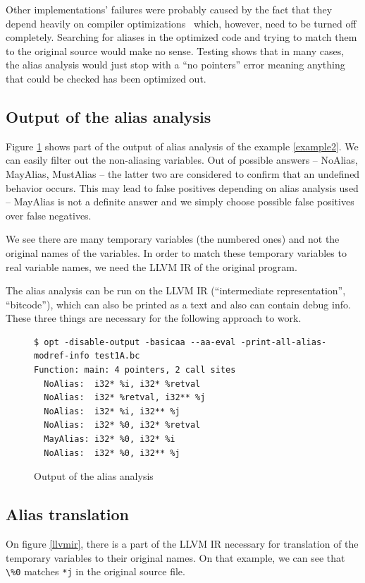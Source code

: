 Other implementations' failures were probably caused by the fact that they depend heavily on compiler optimizations~\cite{alias-analysis-optimizations} which, however, need to be turned off completely. Searching for aliases in the optimized code and trying to match them to the original source would make no sense. Testing shows that in many cases, the alias analysis would just stop with a ``no pointers'' error meaning anything that could be checked has been optimized out.

\subsection{Output of the alias analysis}
Figure \ref{alias-output} shows part of the output of alias analysis of the example \ref{example2}. We can easily filter out the non-aliasing variables. Out of possible answers -- NoAlias, MayAlias, MustAlias -- the latter two are considered to confirm that an undefined behavior occurs. This may lead to false positives depending on alias analysis used -- MayAlias is not a definite answer and we simply choose possible false positives over false negatives.

We see there are many temporary variables (the numbered ones) and not the original names of the variables. In order to match these temporary variables to real variable names, we need the LLVM IR of the original program.

The alias analysis can be run on the LLVM IR (``intermediate representation'', ``bitcode''), which can also be printed as a text and also can contain debug info. These three things are necessary for the following approach to work.
\begin{figure}
\caption{Output of the alias analysis}
\label{alias-output}
\begin{lstlisting}
$ opt -disable-output -basicaa --aa-eval -print-all-alias-modref-info test1A.bc 
Function: main: 4 pointers, 2 call sites
  NoAlias:	i32* %i, i32* %retval
  NoAlias:	i32* %retval, i32** %j
  NoAlias:	i32* %i, i32** %j
  NoAlias:	i32* %0, i32* %retval
  MayAlias:	i32* %0, i32* %i
  NoAlias:	i32* %0, i32** %j
\end{lstlisting}
\end{figure}

\subsection{Alias translation}
On figure \ref{llvmir}, there is a part of the LLVM IR necessary for translation of the temporary variables to their original names. On that example, we can see that \verb|\%0| matches \verb|*j| in the original source file.


